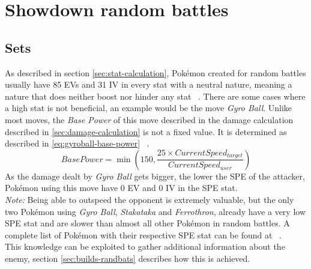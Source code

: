 \section{Showdown random battles}
\label{sec:showdown-randbats}
\subsection{Sets}
\label{sec:randbats-sets}
As described in section \ref{sec:stat-calculation}, Pokémon created for random battles
usually have 85 \ac{EV}s and 31 \ac{IV} in every stat with a neutral nature, 
meaning a nature that does neither boost nor hinder any stat ~\autocite{Smogon:RandBatsGuide}.
There are some cases where a high stat is not beneficial, an example would be the 
move \textit{Gyro Ball}. Unlike most moves, the \textit{Base Power} of this move
described in the damage calculation described in \ref{sec:damage-calculation} is not
a fixed value. It is determined as described in \ref{eq:gyroball-base-power} ~\autocite{Bulbapedia:GyroBall}.
\begin{equation}
	\label{eq:gyroball-base-power}
	BasePower = \min(150, \frac{25 \times CurrentSpeed_{target}}{CurrentSpeed_{user}})
\end{equation} 
As the damage dealt by \textit{Gyro Ball} gets bigger, the lower the \ac{SPE} of the
attacker, Pokémon using this move have 0 \ac{EV} and 0 \ac{IV} in the \ac{SPE} stat. \\
\textit{Note:} Being able to outspeed the opponent is extremely valuable, but the only
two Pokémon using \textit{Gyro Ball}, \textit{Stakataka} and \textit{Ferrothron}, already
have a very low \ac{SPE} stat and are slower than almost all other Pokémon in random
battles. A complete list of Pokémon with their respective \ac{SPE} stat can be found
at ~\autocite{Bulbapedia:PokemonBySpeed}. \\
This knowledge can be exploited to gather additional information about the enemy, section
\ref{sec:builds-randbats} describes how this is achieved.

